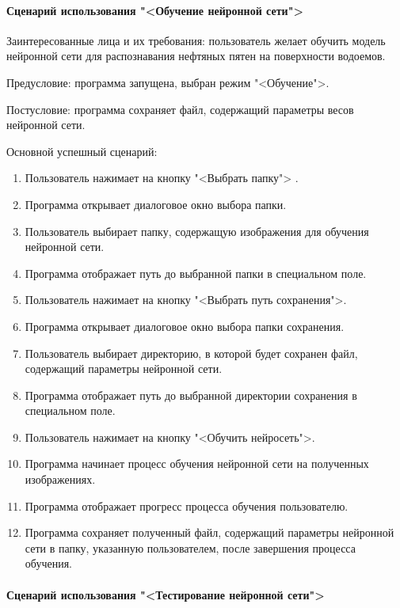 \paragraph{Сценарий использования "<Обучение нейронной сети">}

Заинтересованные лица и их требования: пользователь желает обучить модель нейронной сети для распознавания нефтяных пятен на поверхности водоемов.

Предусловие: программа запущена, выбран режим "<Обучение">.

Постусловие: программа сохраняет файл, содержащий параметры весов нейронной сети.

Основной успешный сценарий:

\begin{enumerate}
	\item Пользователь нажимает на кнопку "<Выбрать папку">	.
	\item Программа открывает диалоговое окно выбора папки.
	\item Пользователь выбирает папку, содержащую изображения для обучения нейронной сети.
	\item Программа отображает путь до выбранной папки в специальном поле.
	\item Пользователь нажимает на кнопку "<Выбрать путь сохранения">.
	\item Программа открывает диалоговое окно выбора папки сохранения.
	\item Пользователь выбирает директорию, в которой будет сохранен файл, содержащий параметры нейронной сети.
	\item Программа отображает путь до выбранной директории сохранения в специальном поле.
	\item Пользователь нажимает на кнопку "<Обучить нейросеть">.
	\item Программа начинает процесс обучения нейронной сети на полученных изображениях.
	\item Программа отображает прогресс процесса обучения пользователю.
	\item Программа сохраняет полученный файл, содержащий параметры нейронной сети в папку, указанную пользователем, после завершения процесса обучения.
\end{enumerate}

\paragraph{Сценарий использования "<Тестирование нейронной сети">}

